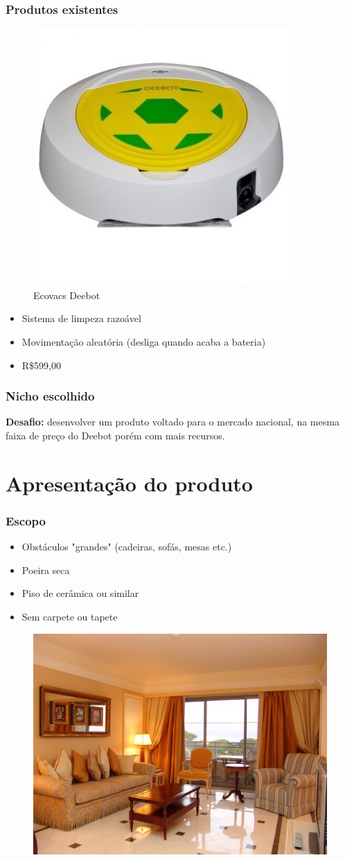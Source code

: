 \documentclass{beamer}
\begin{document}
\begin{frame}
  \frametitle{Produtos existentes}
  \begin{figure}[ht]
    \includegraphics[width=.30\textwidth]{images/deebot.jpg}
    \caption{Ecovacs Deebot}
  \end{figure}
  \begin{itemize}
  	\item Sistema de limpeza razoável
  	\item Movimentação aleatória (desliga quando acaba a bateria)
  	\item R\$599,00
  \end{itemize}

\end{frame}

\begin{frame}
  \frametitle{Nicho escolhido}
  \textbf{Desafio:} desenvolver um produto voltado para o mercado nacional, na mesma faixa de preço do Deebot porém com mais recursos.
\end{frame}

\section{Apresentação do produto}
\begin{frame}
  \frametitle{Escopo}
  \begin{itemize}
  	\item Obstáculos "grandes" (cadeiras, sofás, mesas etc.)
  	\item Poeira seca
  	\item Piso de cerâmica ou similar
  	\item Sem carpete ou tapete
  \end{itemize}
  
  \begin{figure}
    \includegraphics[width=.30\textwidth]{images/sala.jpg}
  \end{figure}
  
\end{frame}
\end{document}
